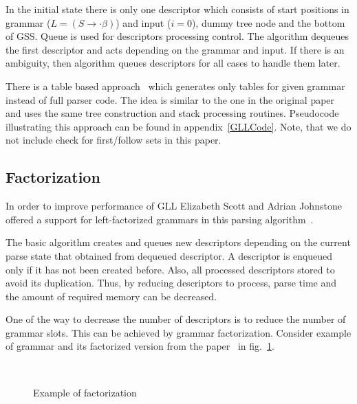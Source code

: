 \documentclass[runningheads,a4paper]{llncs}
\begin{document}
In the initial state there is only one descriptor which consists of start positions in grammar ($L = (S \to \cdot \beta)$) and input ($i=0$), dummy tree node and the bottom of GSS.
Queue is used for descriptors processing control.
The algorithm dequeues the first descriptor and acts depending on the grammar and input.
If there is an ambiguity, then algorithm queues descriptors for all cases to handle them later. 

There is a table based approach~\cite{ragozina} which generates only tables for given grammar instead of full parser code.
The idea is similar to the one in the original paper and uses the same tree construction and stack processing routines.
Pseudocode illustrating this approach can be found in appendix~\ref{GLLCode}. Note, that we do not include check for first/follow sets in this paper.


\subsection{Factorization}%

In order to improve performance of GLL Elizabeth Scott and Adrian Johnstone offered a support for left-factorized grammars in this parsing algorithm~\cite{scott2016structuring}. 

The basic algorithm creates and queues new descriptors depending on the current parse state that obtained from dequeued descriptor. 
A descriptor is enqueued only if it has not been created before.
Also, all processed descriptors stored to avoid its duplication.
Thus, by reducing descriptors to process, parse time and the amount of required memory can be decreased.

One of the way to decrease the number of descriptors is to reduce the number of grammar slots. 
This can be achieved by grammar factorization.
Consider example of grammar and its factorized version from the paper~\cite{scott2016structuring} in fig.~\ref{fig:ExampleOfFactorization}.

\begin{figure}
    \centering
    ~
    \caption{Example of factorization}
    \label{fig:ExampleOfFactorization}
\end{figure}
\end{document}
